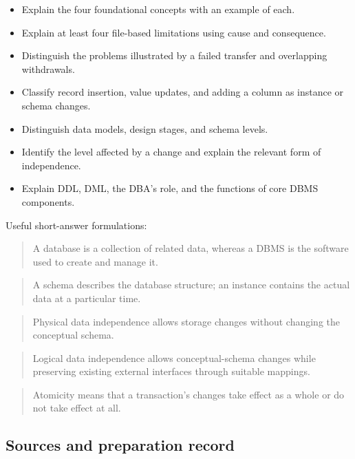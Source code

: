 \begin{itemize}
\tightlist
\item[$\square$]
  Explain the four foundational concepts with an example of each.
\item[$\square$]
  Explain at least four file-based limitations using cause and consequence.
\item[$\square$]
  Distinguish the problems illustrated by a failed transfer and overlapping withdrawals.
\item[$\square$]
  Classify record insertion, value updates, and adding a column as instance or schema changes.
\item[$\square$]
  Distinguish data models, design stages, and schema levels.
\item[$\square$]
  Identify the level affected by a change and explain the relevant form of independence.
\item[$\square$]
  Explain DDL, DML, the DBA's role, and the functions of core DBMS components.
\end{itemize}

Useful short-answer formulations:

\begin{quote}
A database is a collection of related data, whereas a DBMS is the software used to create and manage it.
\end{quote}

\begin{quote}
A schema describes the database structure; an instance contains the actual data at a particular time.
\end{quote}

\begin{quote}
Physical data independence allows storage changes without changing the conceptual schema.
\end{quote}

\begin{quote}
Logical data independence allows conceptual-schema changes while preserving existing external interfaces through suitable mappings.
\end{quote}

\begin{quote}
Atomicity means that a transaction's changes take effect as a whole or do not take effect at all.
\end{quote}

\subsection{Sources and preparation record}\label{01_database_fundamentals_en-sources-and-preparation-record}


